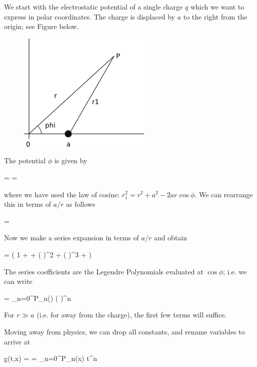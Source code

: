 
We start with the electrostatic potential of a single charge $q$ which we want to express in polar coordinates. The charge is displaced by $a$ to the right from the origin; see Figure below.


\begin{figure}[H]
	\includegraphics[scale=1.0]{images/legendre_dipol.png}
\end{figure}

The potential $\phi$ is given by

\bee
\Phi =   =  
\eee

where we have used the law of cosine: $r_1^2 = r^2 + a^2 - 2ar\cos\phi$. We can rearrange this in terms of $a/r$ as follows

\bee
\Phi =  
\eee

Now we make a series expansion in terms of $a/r$ and obtain

\bee
\Phi =  \left( 1 + \cos\phi {} +  \left( \right)^2 +  \left( \right)^3 + \cdots \right)
\eee

The series coefficients are the Legendre Polynomials evaluated at $\cos\phi$; i.e. we can write

\bee
\Phi =  \sum_{n=0}^\infty P_n(\cos\phi) \left(  \right)^n
\eee

For $r \gg a$ (i.e. for away from the charge), the first few terms will suffice.

Moving away from physics, we can drop all constants, and rename variables to arrive at

\be\label{2018-09-18:eq1}
g(t,x) =  = \sum_{n=0}^\infty P_n(x) t^n
\ee

